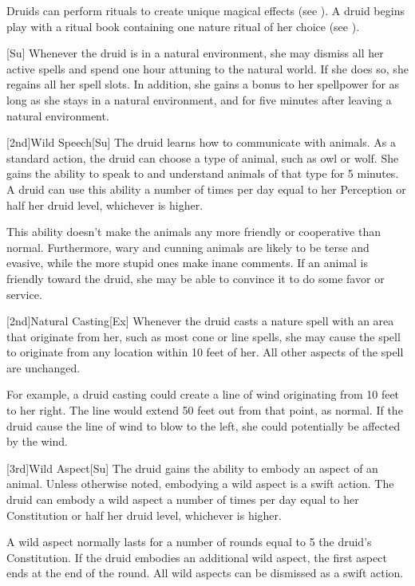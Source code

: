 Druids can perform rituals to create unique magical effects (see ).
A druid begins play with a ritual book containing one nature ritual of her choice (see ).

[Su]
Whenever the druid is in a natural environment, she may dismiss all her active spells and spend one hour attuning to the natural world.
If she does so, she regains all her spell slots. In addition, she gains a  bonus to her spellpower for as long as she stays in a natural environment, and for five minutes after leaving a natural environment.

[2nd]{Wild Speech}[Su]
The druid learns how to communicate with animals.
As a standard action, the druid can choose a type of animal, such as owl or wolf.
She gains the ability to speak to and understand animals of that type for 5 minutes.
A druid can use this ability a number of times per day equal to her Perception or half her druid level, whichever is higher.

This ability doesn't make the animals any more friendly or cooperative than normal.
Furthermore, wary and cunning animals are likely to be terse and evasive, while the more stupid ones make inane comments.
If an animal is friendly toward the druid, she may be able to convince it to do some favor or service.

[2nd]{Natural Casting}[Ex]
Whenever the druid casts a nature spell with an area that originate from her, such as most cone or line spells, she may cause the spell to originate from any location within 10 feet of her.
All other aspects of the spell are unchanged.

For example, a druid casting  could create a line of wind originating from 10 feet to her right.
The line would extend 50 feet out from that point, as normal.
If the druid cause the line of wind to blow to the left, she could potentially be affected by the wind.

[3rd]{Wild Aspect}[Su]
The druid gains the ability to embody an aspect of an animal.
Unless otherwise noted, embodying a wild aspect is a swift action.
The druid can embody a wild aspect a number of times per day equal to her Constitution or half her druid level, whichever is higher.

A wild aspect normally lasts for a number of rounds equal to 5 \add the druid's Constitution.
If the druid embodies an additional wild aspect, the first aspect ends at the end of the round.
All wild aspects can be dismissed as a swift action.

